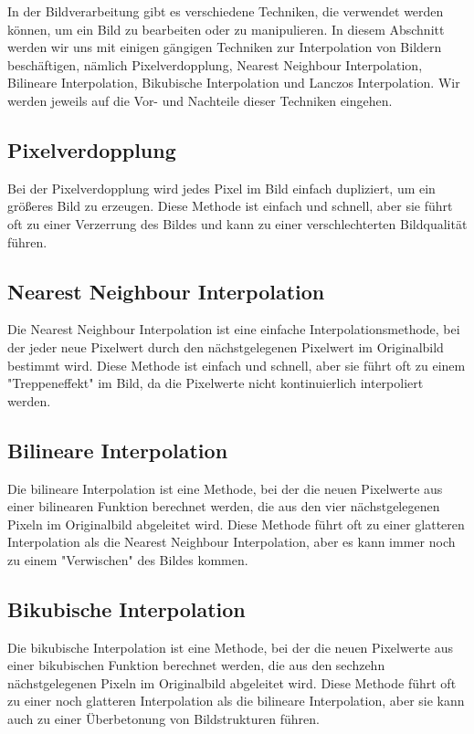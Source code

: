 In der Bildverarbeitung gibt es verschiedene Techniken, die verwendet werden können, um ein Bild zu bearbeiten oder zu manipulieren. 
In diesem Abschnitt werden wir uns mit einigen gängigen Techniken zur Interpolation von Bildern beschäftigen, nämlich Pixelverdopplung, Nearest Neighbour Interpolation, Bilineare Interpolation, Bikubische Interpolation und Lanczos Interpolation. 
Wir werden jeweils auf die Vor- und Nachteile dieser Techniken eingehen.

\subsection{Pixelverdopplung}

Bei der Pixelverdopplung wird jedes Pixel im Bild einfach dupliziert, um ein größeres Bild zu erzeugen. 
Diese Methode ist einfach und schnell, aber sie führt oft zu einer Verzerrung des Bildes und kann zu einer verschlechterten Bildqualität führen.

\subsection{Nearest Neighbour Interpolation}

Die Nearest Neighbour Interpolation ist eine einfache Interpolationsmethode, bei der jeder neue Pixelwert durch den nächstgelegenen Pixelwert im Originalbild bestimmt wird. 
Diese Methode ist einfach und schnell, aber sie führt oft zu einem "Treppeneffekt" im Bild, da die Pixelwerte nicht kontinuierlich interpoliert werden.

\subsection{Bilineare Interpolation}

Die bilineare Interpolation ist eine Methode, bei der die neuen Pixelwerte aus einer bilinearen Funktion berechnet werden, die aus den vier nächstgelegenen Pixeln im Originalbild abgeleitet wird. 
Diese Methode führt oft zu einer glatteren Interpolation als die Nearest Neighbour Interpolation, aber es kann immer noch zu einem "Verwischen" des Bildes kommen.

\subsection{Bikubische Interpolation}

Die bikubische Interpolation ist eine Methode, bei der die neuen Pixelwerte aus einer bikubischen Funktion berechnet werden, die aus den sechzehn nächstgelegenen Pixeln im Originalbild abgeleitet wird.
Diese Methode führt oft zu einer noch glatteren Interpolation als die bilineare Interpolation, aber sie kann auch zu einer Überbetonung von Bildstrukturen führen.

